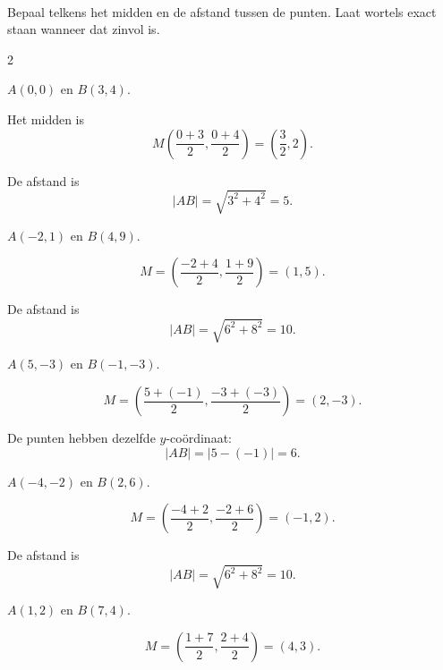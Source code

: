 \documentclass{ximera}
\begin{document}
\begin{oefening}{\oefB\ESS}
\\

Bepaal telkens het midden en de afstand tussen de punten.
Laat wortels exact staan wanneer dat zinvol is.

\begin{multicols}{2}

\begin{question}
$A(0,0)$ en $B(3,4)$.

\begin{oplossing}
Het midden is
\[
M\left(
\frac{0+3}{2},
\frac{0+4}{2}
\right)
=
\left(\frac32,2\right).
\]

De afstand is
\[
|AB|
=\sqrt{3^2+4^2}
=5.
\]
\end{oplossing}
\end{question}


\begin{question}
$A(-2,1)$ en $B(4,9)$.

\begin{oplossing}
\[
M=
\left(
\frac{-2+4}{2},
\frac{1+9}{2}
\right)
=(1,5).
\]

De afstand is
\[
|AB|
=\sqrt{6^2+8^2}
=10.
\]
\end{oplossing}
\end{question}


\begin{question}
$A(5,-3)$ en $B(-1,-3)$.

\begin{oplossing}
\[
M=
\left(
\frac{5+(-1)}2,
\frac{-3+(-3)}2
\right)
=(2,-3).
\]

De punten hebben dezelfde $y$-coördinaat:
\[
|AB|
=|5-(-1)|
=6.
\]
\end{oplossing}
\end{question}


\begin{question}
$A(-4,-2)$ en $B(2,6)$.

\begin{oplossing}
\[
M=
\left(
\frac{-4+2}{2},
\frac{-2+6}{2}
\right)
=(-1,2).
\]

De afstand is
\[
|AB|
=\sqrt{6^2+8^2}
=10.
\]
\end{oplossing}
\end{question}


\begin{question}
$A(1,2)$ en $B(7,4)$.

\begin{oplossing}
\[
M=
\left(
\frac{1+7}{2},
\frac{2+4}{2}
\right)
=(4,3).
\]


\end{oplossing}
\end{question}
\end{multicols}
\end{oefening}
\end{document}
